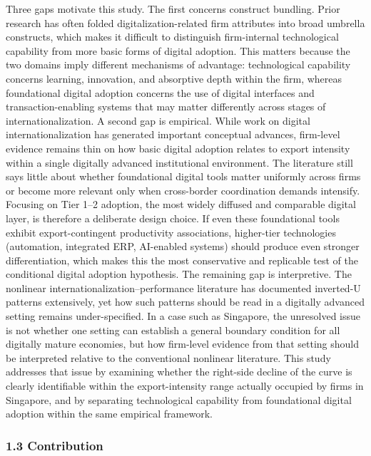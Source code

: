 \documentclass[12pt,a4paper]{article}
\begin{document}
Three gaps motivate this study. The first concerns construct bundling.
Prior research has often folded digitalization-related firm attributes
into broad umbrella constructs, which makes it difficult to distinguish
firm-internal technological capability from more basic forms of digital
adoption. This matters because the two domains imply different
mechanisms of advantage: technological capability concerns learning,
innovation, and absorptive depth within the firm, whereas foundational
digital adoption concerns the use of digital interfaces and
transaction-enabling systems that may matter differently across stages
of internationalization. A second gap is empirical. While work on
digital internationalization has generated important conceptual
advances, firm-level evidence remains thin on how basic digital adoption
relates to export intensity within a single digitally advanced
institutional environment. The literature still says little about
whether foundational digital tools matter uniformly across firms or
become more relevant only when cross-border coordination demands
intensify. Focusing on Tier 1--2 adoption, the most widely diffused and
comparable digital layer, is therefore a deliberate design choice. If
even these foundational tools exhibit export-contingent productivity
associations, higher-tier technologies (automation, integrated ERP,
AI-enabled systems) should produce even stronger differentiation, which
makes this the most conservative and replicable test of the conditional
digital adoption hypothesis. The remaining gap is interpretive. The
nonlinear internationalization--performance literature has documented
inverted-U patterns extensively, yet how such patterns should be read in
a digitally advanced setting remains under-specified. In a case such as
Singapore, the unresolved issue is not whether one setting can establish
a general boundary condition for all digitally mature economies, but how
firm-level evidence from that setting should be interpreted relative to
the conventional nonlinear literature. This study addresses that issue
by examining whether the right-side decline of the curve is clearly
identifiable within the export-intensity range actually occupied by
firms in Singapore, and by separating technological capability from
foundational digital adoption within the same empirical framework.

\hypertarget{13-contribution}{%
\subsubsection{1.3 Contribution}\label{13-contribution}}
\end{document}
